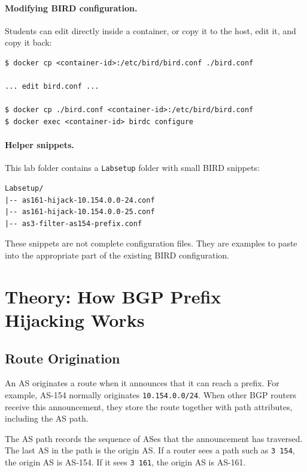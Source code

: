 \paragraph{Modifying BIRD configuration.}
Students can edit  directly inside a container, or
copy it to the host, edit it, and copy it back:

\begin{lstlisting}
$ docker cp <container-id>:/etc/bird/bird.conf ./bird.conf

... edit bird.conf ...

$ docker cp ./bird.conf <container-id>:/etc/bird/bird.conf
$ docker exec <container-id> birdc configure
\end{lstlisting}

\paragraph{Helper snippets.}
This lab folder contains a \texttt{Labsetup} folder with small BIRD snippets:

\begin{lstlisting}
Labsetup/
|-- as161-hijack-10.154.0.0-24.conf
|-- as161-hijack-10.154.0.0-25.conf
|-- as3-filter-as154-prefix.conf
\end{lstlisting}

These snippets are not complete configuration files. They are examples to paste
into the appropriate part of the existing BIRD configuration.


\section{Theory: How BGP Prefix Hijacking Works}

\subsection{Route Origination}

An AS originates a route when it announces that it can reach a prefix. For
example, AS-154 normally originates \texttt{10.154.0.0/24}. When other BGP
routers receive this announcement, they store the route together with path
attributes, including the AS path.

The AS path records the sequence of ASes that the announcement has traversed.
The last AS in the path is the origin AS. If a router sees a path such as
\texttt{3 154}, the origin AS is AS-154. If it sees \texttt{3 161}, the origin
AS is AS-161.

